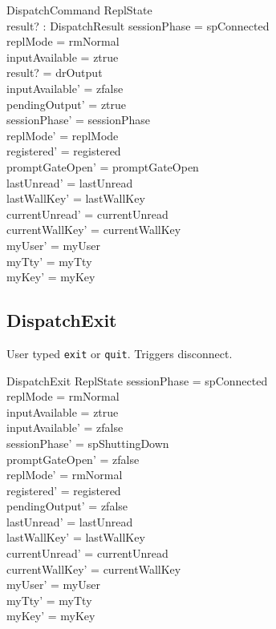 \documentclass[a4paper,10pt,fleqn]{article}
\begin{document}
\begin{schema}{DispatchCommand}
  \Delta ReplState \\
  result? : DispatchResult
\where
  sessionPhase = spConnected \\
  replMode = rmNormal \\
  inputAvailable = ztrue \\
  result? = drOutput \\
  inputAvailable' = zfalse \\
  pendingOutput' = ztrue \\
  sessionPhase' = sessionPhase \\
  replMode' = replMode \\
  registered' = registered \\
  promptGateOpen' = promptGateOpen \\
  lastUnread' = lastUnread \\
  lastWallKey' = lastWallKey \\
  currentUnread' = currentUnread \\
  currentWallKey' = currentWallKey \\
  myUser' = myUser \\
  myTty' = myTty \\
  myKey' = myKey
\end{schema}

\subsection{DispatchExit}

User typed \texttt{exit} or \texttt{quit}.  Triggers disconnect.

\begin{schema}{DispatchExit}
  \Delta ReplState
\where
  sessionPhase = spConnected \\
  replMode = rmNormal \\
  inputAvailable = ztrue \\
  inputAvailable' = zfalse \\
  sessionPhase' = spShuttingDown \\
  promptGateOpen' = zfalse \\
  replMode' = rmNormal \\
  registered' = registered \\
  pendingOutput' = zfalse \\
  lastUnread' = lastUnread \\
  lastWallKey' = lastWallKey \\
  currentUnread' = currentUnread \\
  currentWallKey' = currentWallKey \\
  myUser' = myUser \\
  myTty' = myTty \\
  myKey' = myKey
\end{schema}
\end{document}
